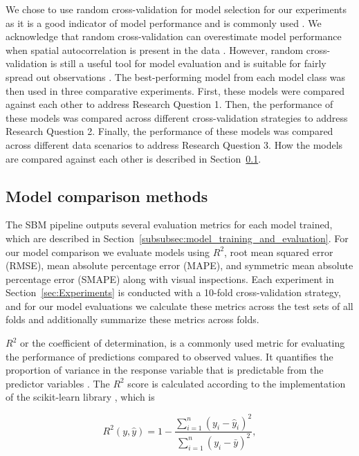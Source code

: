 We chose to use random cross-validation for model selection for our experiments as it is a good indicator of model performance and is commonly used \parencite{efron_estimating_1983}. We acknowledge that random cross-validation can overestimate model performance when spatial autocorrelation is present in the data \parencite{wang2023}. However, random cross-validation is still a useful tool for model evaluation and is suitable for fairly spread out observations \parencite{de_bruin_dealing_2022}. The best-performing model from each model class was then used in three comparative experiments. First, these models were compared against each other to address Research Question 1. Then, the performance of these models was compared across different cross-validation strategies to address Research Question 2. Finally, the performance of these models was compared across different data scenarios to address Research Question 3. How the models are compared against each other is described in Section~\ref{subsec:model_comparison}.

\subsection{Model comparison methods}\label{subsec:model_comparison}

The SBM pipeline outputs several evaluation metrics for each model trained,
which are described in Section~\ref{subsubsec:model_training_and_evaluation}. For our model comparison we evaluate models using \(R^2\), root mean squared error (RMSE), mean absolute percentage error (MAPE), and symmetric mean absolute percentage error (SMAPE) along with visual inspections. Each experiment in Section~\ref{sec:Experiments} is conducted with a 10-fold cross-validation strategy, and for our model evaluations we calculate these metrics across the test sets of all folds and additionally summarize these metrics across folds.

\(R^2\) or the coefficient of determination, is a commonly used metric for evaluating the performance of predictions compared to observed values. It quantifies the proportion of variance in the response variable that is predictable from the predictor variables \parencite{chicco2021}. The \(R^2\) score is calculated according to the implementation of the scikit-learn library \parencite{scikit-learn}, which is

\[R^2(y,\hat{y}) = 1 - \frac{\sum_{i=1}^n (y_i - \hat{y}_i)^2}{\sum_{i=1}^n (y_i - \bar{y})^2},\]

